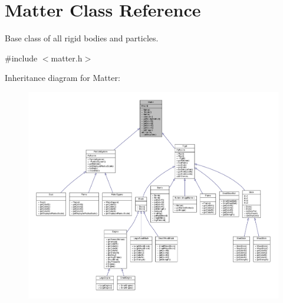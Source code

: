 \hypertarget{classMatter}{}\section{Matter Class Reference}
\label{classMatter}


Base class of all rigid bodies and particles.  




{\ttfamily \#include $<$matter.\+h$>$}



Inheritance diagram for Matter\+:\nopagebreak
\begin{figure}[H]
\begin{center}
\leavevmode
\includegraphics[width=350pt]{classMatter__inherit__graph}
\end{center}
\end{figure}


